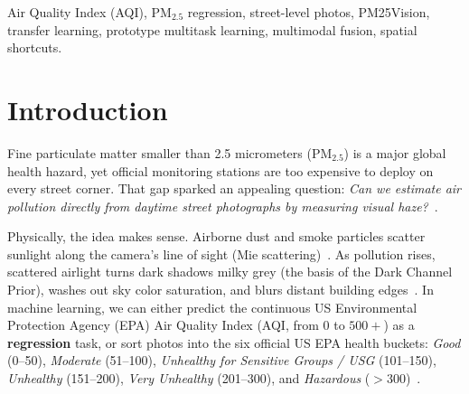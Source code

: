 \documentclass[conference]{IEEEtran}
\newcommand{\pmtwofive}{PM$_{2.5}$}
\begin{document}
\begin{IEEEkeywords}
  Air Quality Index (AQI), \pmtwofive{} regression, street-level photos,
  PM25Vision, transfer learning, prototype multitask learning, multimodal
  fusion, spatial shortcuts.
\end{IEEEkeywords}

\section{Introduction}
\label{sec:introduction}

Fine particulate matter smaller than 2.5 micrometers (\pmtwofive) is a major
global health hazard, yet official monitoring stations are too expensive to
deploy on every street corner. That gap sparked an appealing question:
\textit{Can we estimate air pollution directly from daytime street photographs
by measuring visual haze?}~\cite{marzaguiReviewImageQuality2024,
wangLightweightAirQuality2024, wangPrototypeFeatureRepresentationGuided2026}.

Physically, the idea makes sense. Airborne dust and smoke particles scatter
sunlight along the camera's line of sight (Mie
scattering)~\cite{marzaguiReviewImageQuality2024,
yadavRoadsideTreeImageBased2025}. As pollution rises, scattered airlight turns
dark shadows milky grey (the basis of the Dark Channel Prior), washes out sky
color saturation, and blurs distant building
edges~\cite{chakrabortyCanImageTell2024, dohaDeepMultiTaskLearning2026}. In
machine learning, we can either predict the continuous US Environmental
Protection Agency (EPA) Air Quality Index (AQI, from 0 to $500 +$) as a
\textbf{regression} task, or sort photos into the six official US EPA health
buckets: \textit{Good} (0--50), \textit{Moderate} (51--100), \textit{Unhealthy
for Sensitive Groups / USG} (101--150), \textit{Unhealthy} (151--200),
\textit{Very Unhealthy} (201--300), and \textit{Hazardous}
($> 300$)~\cite{wangLightweightAirQuality2024,
wangPrototypeFeatureRepresentationGuided2026}.

\end{document}
